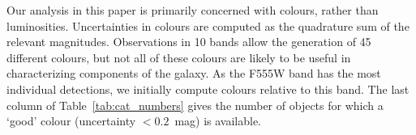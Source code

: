 Our analysis in this paper is primarily concerned with colours, rather than luminosities.
Uncertainties in colours are computed as the quadrature sum of the relevant magnitudes.
Observations in 10 bands allow the generation of 45 different colours,
but not all of these colours are likely to be useful in characterizing components of the galaxy.
As the F555W band has the most individual detections, %
we initially compute colours relative to this band.
The last column of Table~\ref{tab:cat_numbers} gives the number of objects for which a `good' colour (uncertainty $<0.2$~mag) is available.





